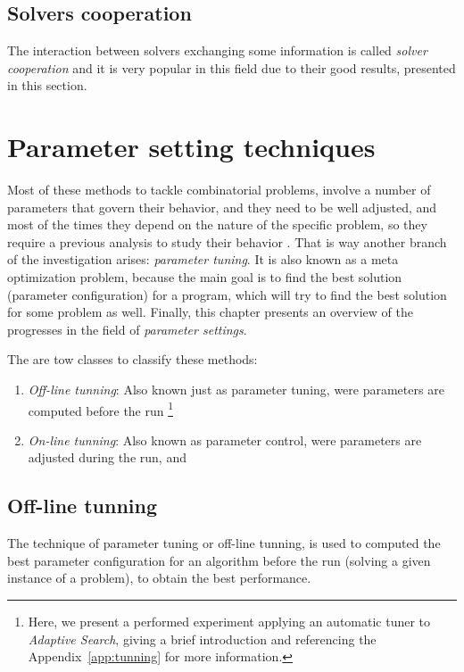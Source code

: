 \documentclass[a4paper]{book} %
\begin{document}
\subsection{Solvers cooperation}

The interaction between solvers exchanging some information is called {\it solver cooperation} and it is very popular in this field due to their good results, presented in this section.

\section{Parameter setting techniques}

Most of these methods to tackle combinatorial problems, involve a number of parameters that govern their behavior, and they need to be well adjusted, and most of the times they depend on the nature of the specific problem, so they require a previous analysis to study their behavior \cite{Birattari2005}. That is way another branch of the investigation arises: {\it parameter tuning}. It is also known as a meta optimization problem, because the main goal is to find the best solution (parameter configuration) for a program, which will try to find the best solution for some problem as well. Finally, this chapter presents an overview of the progresses in the field of \textit{parameter settings}.

The are tow classes to classify these methods: 
\begin{enumerate}
\item \textit{Off-line tunning}: Also known just as parameter tuning, were parameters are computed before the run \footnote{Here, we present a performed experiment applying an automatic tuner to \textit{Adaptive Search}, giving a brief introduction and referencing the Appendix~\ref{app:tunning} for more information.}
\item \textit{On-line tunning}: Also known as parameter control, were parameters are adjusted during the run, and
\end{enumerate}

\subsection{Off-line tunning}

The technique of parameter tuning or off-line tunning, is used to computed the best parameter configuration for an algorithm before the run (solving a given instance of a problem), to obtain the best performance.
\end{document}
